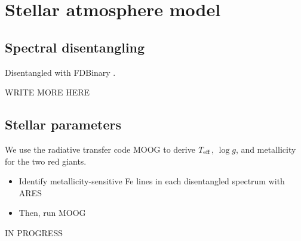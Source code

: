 \section{Stellar atmosphere model}\label{atm}

\subsection{Spectral disentangling}\label{disentangle}
Disentangled with FDBinary \citep{ilj04}.

WRITE MORE HERE

\subsection{Stellar parameters}\label{parameters}
We use the radiative transfer code MOOG \citep{sne73} to derive $T_{\rm{eff}}$, $\log g$, and metallicity for the two red giants.
\begin{itemize}
\item Identify metallicity-sensitive Fe lines in each disentangled spectrum with ARES
\item Then, run MOOG
\end{itemize}

IN PROGRESS